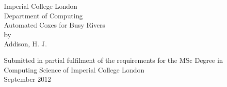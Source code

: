 \begin{titlepage}

  \begin{center}
    \Large
    Imperial College London\\[1cm]

    Department of Computing\\[2cm]
    
    \huge
    Automated Coxes for Busy Rivers\\[1cm]
    \Large
    by\\[1cm]

    Addison, H. J.\\
  \vfill
  
  Submitted in partial fulfilment of the requirements for the MSc Degree in Computing Science of Imperial College London\\[3cm]
  
  September 2012
  
  \end{center}

\end{titlepage}
